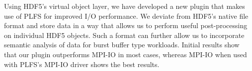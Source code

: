 Using HDF5's virtual object layer, we have developed a new plugin that makes use of PLFS for improved I/O performance. We deviate from HDF5's native file format and store data in a way that allows us to perform useful post-processing on individual HDF5 objects. 
Such a format can further allow us to incorporate semantic analysis of data for burst buffer type workloads. 
Initial results show that our plugin outperforms MPI-IO in most cases, whereas MPI-IO when used with PLFS's MPI-IO driver shows the best results. 

